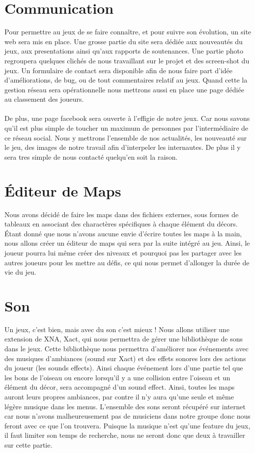 \documentclass [11pt]{report}
\begin{document}
	\section {Communication}
	Pour permettre au jeux de se faire conna\^itre, et pour suivre son \'evolution, un site web sera mis en place. Une grosse partie du site sera dédiée aux nouveautés du jeux, aux presentations ainsi qu'aux rapports de soutenances. Une partie photo regroupera quelques clichés de nous travaillant sur le projet et des screen-shot du jeux. Un formulaire de contact sera disponible afin de nous faire part d'idée d'am\'eliorations, de bug, ou de tout commentaires relatif au jeux. Quand cette la gestion réseau sera opérationnelle nous mettrons aussi en place une page dédiée au classement des joueurs.
\\\\ \indent
	De plus, une page facebook sera ouverte à l'effigie de notre jeux. Car nous savons qu'il est plus simple de toucher un maximum de personnes par l'intermédiaire de ce réseau social. Nous y mettrons l'ensemble de nos actualités, les nouveauté sur le jeu, des images de notre travail afin d'interpeler les internautes. De plus il y sera tres simple de nous contacté quelqu'en soit la raison.

	\section {\'Editeur de Maps}
	Nous avons décidé de faire les maps dans des fichiers externes, sous formes de tableaux en associant des charactères spécifiques à chaque élément du décors. \'Etant donné que nous n'avons aucune envie d'écrire toutes les maps à la main, nous allons créer un éditeur de maps qui sera par la suite intégré au jeu. Ainsi, le joueur pourra lui même créer des niveaux et pourquoi pas les partager avec les autres joueurs pour les mettre au défis, ce qui nous permet d'allonger la durée de vie du jeu.\\\vspace{5mm}


	\section {Son}
	Un jeux, c'est bien, mais avec du son c'est mieux ! Nous allons utiliser une extension de XNA, Xact, qui nous permettra de g\'erer une biblioth\`eque de sons dans le jeux. Cette biblioth\`eque nous permettra d'am\'eliorer nos \'ev\'enements avec des musiques d'ambiances (sound sur Xact) et des effets sonores lors des actions du joueur (les sounds effects). Ainsi chaque événement lors d'une partie tel que les bons de l'oiseau ou encore lorsqu'il y a une collision entre l'oiseau et un élément du décor, sera accompagné d'un sound effect. Ainsi, toutes les maps auront leurs propres ambiances, par contre il n'y aura qu'une seule et même légère musique dans les menus. L'ensemble des sons seront récupéré sur internet car nous n'avons malheureusement pas de musiciens dans notre groupe donc nous feront avec ce que l'on trouvera. Puisque la musique n'est qu'une feature du jeux, il faut limiter son temps de recherche, nous ne seront donc que deux à travailler sur cette partie.
\end{document}
